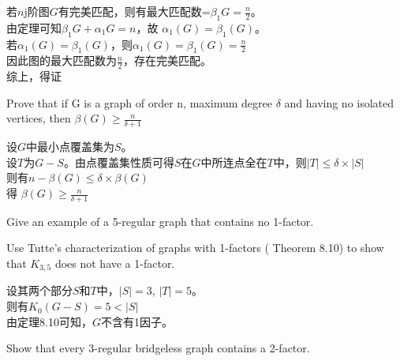 \documentclass[a4paper, justified]{tufte-handout}
\begin{document}
\begin{solution}
若$n$j阶图$G$有完美匹配，则有最大匹配数=$\beta_1{G}=\frac{n}{2}$。\\
由定理可知$\beta_1{G}+\alpha_1{G}=n$，故 $\alpha_1(G) = \beta_1(G)$。\\
若$\alpha_1(G) = \beta_1(G)$，则$\alpha_1(G) = \beta_1(G)=\frac{n}{2}$\\
因此图的最大匹配数为$\frac{n}{2}$，存在完美匹配。\\
综上，得证
\end{solution}

\begin{problem}[CZ 8.16]
 Prove that if G is a graph of order n, maximum degree $\delta$ and having no isolated vertices, then $\beta(G)\geq \frac{n}{\delta + 1}$
\end{problem}

\begin{solution}
设$G$中最小点覆盖集为$S$。\\
设$T$为$G-S$。由点覆盖集性质可得$S$在$G$中所连点全在$T$中，则$|T|\leq \delta \times |S|$\\
则有$n-\beta(G)\leq \delta \times \beta(G)$\\
得 $\beta(G)\geq \frac{n}{\delta + 1}$
\end{solution}

\begin{problem}[CZ 8.18]
Give an example of a 5-regular graph that contains no 1-factor.
\end{problem}

\begin{solution}
\newpage
\end{solution}

\begin{problem}[CZ 8.21]
Use Tutte’s characterization of graphs with 1-factors ( Theorem 8.10) to show that $K_{3,5}$ does not have a 1-factor.
\end{problem}

\begin{solution}
设其两个部分$S$和$T$中，$|S|= 3$, $|T|=5$。\\
则有$K_0(G-S)=5<|S|$\\
由定理8.10可知，$G$不含有1因子。
\end{solution}

\begin{problem}[CZ 8.24]
Show that every 3-regular bridgeless graph contains a 2-factor.
\end{problem}
\end{document}

